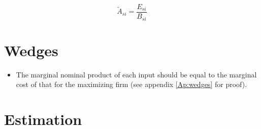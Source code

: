 \documentclass[12pt]{article} %
\begin{document}
\begin{equation*}
    \tilde{A}_{si} = \frac{E_{si}}{B_{si}}
\end{equation*}



\section*{Wedges}
\begin{itemize}
    \item The marginal nominal product of each input should be equal to the marginal cost of that for the maximizing firm (see appendix \ref{Ap:wedges} for proof).
	
\end{itemize}
\section*{Estimation}

\clearpage
\end{document}

